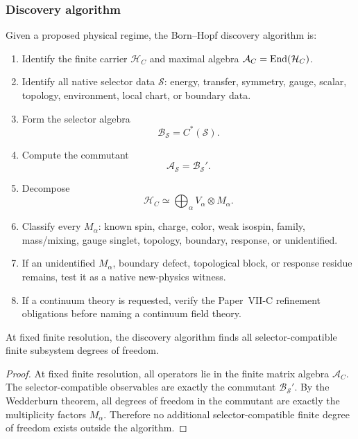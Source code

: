 \documentclass[12pt,a4paper]{article}
\begin{document}
\subsubsection{Discovery algorithm}

\begin{definition}
\label{p12:def:finite-discovery-algorithm}
Given a proposed physical regime, the Born--Hopf discovery algorithm is:

\begin{enumerate}[label=\textbf{Step \arabic*.}, leftmargin=3em]
\item Identify the finite carrier \(\mathcal H_C\) and maximal algebra \(\mathcal A_C=\operatorname{End}(\mathcal H_C)\).
\item Identify all native selector data \(\mathcal S\): energy, transfer, symmetry, gauge, scalar, topology, environment, local chart, or boundary data.
\item Form the selector algebra
\[
\mathcal B_{\mathcal S}=C^\ast(\mathcal S).
\]
\item Compute the commutant
\[
\mathcal A_{\mathcal S}=\mathcal B_{\mathcal S}'.
\]
\item Decompose
\[
\mathcal H_C\simeq\bigoplus_\alpha V_\alpha\otimes M_\alpha.
\]
\item Classify every \(M_\alpha\): known spin, charge, color, weak isospin, family, mass/mixing, gauge singlet, topology, boundary, response, or unidentified.
\item If an unidentified \(M_\alpha\), boundary defect, topological block, or response residue remains, test it as a native new-physics witness.
\item If a continuum theory is requested, verify the Paper~VII-C refinement obligations before naming a continuum field theory.
\end{enumerate}
\end{definition}

\begin{theorem}
\label{p12:thm:finite-resolution-discovery-coverage}
At fixed finite resolution, the discovery algorithm finds all selector-compatible finite subsystem degrees of freedom.
\end{theorem}

\begin{proof}
At fixed finite resolution, all operators lie in the finite matrix algebra \(\mathcal A_C\).  The selector-compatible observables are exactly the commutant \(\mathcal B_{\mathcal S}'\).  By the Wedderburn theorem, all degrees of freedom in the commutant are exactly the multiplicity factors \(M_\alpha\).  Therefore no additional selector-compatible finite degree of freedom exists outside the algorithm.
\end{proof}
\end{document}
